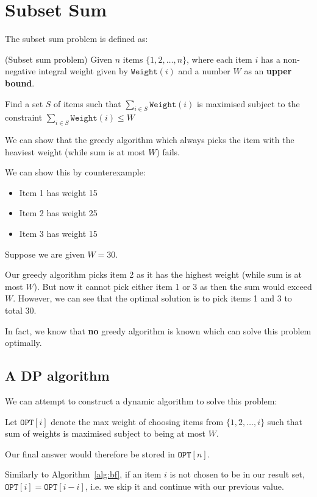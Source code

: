 \documentclass{article}
\begin{document}
\section{Subset Sum}

The subset sum problem is defined as:

\begin{problem}(Subset sum problem)
  Given $n$ items $\{ 1,2,\ldots,n \} $, where each item $i$ has a non-negative integral weight given by $\texttt{Weight}(i) $ and a  number $W$ as an \textbf{upper bound}.

  Find a set $S$ of items such that $\sum_{i\in S} \texttt{Weight} (i) $ is maximised subject to the constraint $\sum_{i\in S} \texttt{Weight} (i) \leq W $
\end{problem}

We can show that the greedy algorithm which always picks the item with the heaviest weight (while sum is at most $W$) fails.

We can show this by counterexample:

\begin{itemize}
  \item Item 1 has weight 15
  \item Item 2 has weight 25
  \item Item 3 has weight 15
\end{itemize}

Suppose we are given $W=30$.

Our greedy algorithm picks item 2 as it has the highest weight (while sum is at most $W$). But now it cannot pick either item 1 or 3 as then the sum would exceed $W$. However, we can see that the optimal solution is to pick items 1 and 3 to total 30.

In fact, we know that \textbf{no } greedy algorithm is known which can solve this problem optimally.

\subsection{A DP algorithm}

We can attempt to construct a dynamic algorithm to solve this problem:

Let $\texttt{OPT} [i]$ denote the max weight of choosing items from $\{ 1,2,\ldots, i \} $ such that sum of weights is maximised subject to being at most $W$.

Our final answer would therefore be stored in $\texttt{OPT} [n]$.

Similarly to Algorithm~\ref{alg:bf}, if an item $i$ is not chosen to be in our result set, $\texttt{OPT} [i] = \texttt{OPT} [i-i]$, i.e. we skip it and continue with our previous value.
\end{document}
